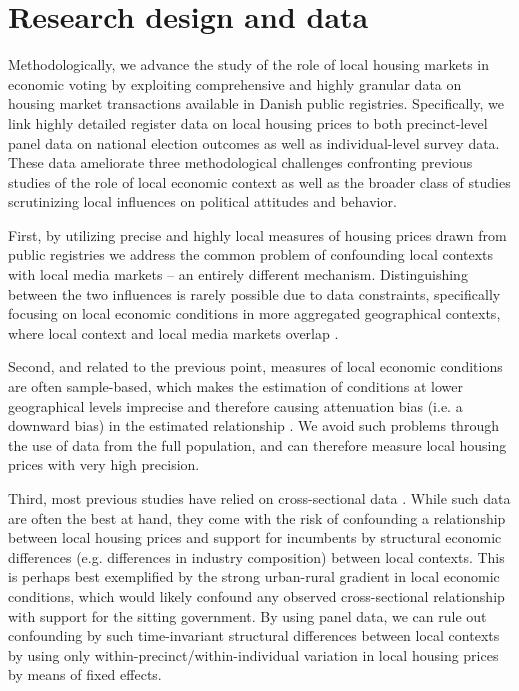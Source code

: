 \documentclass[12pt,a4paper]{article}
\begin{document}
	\section{Research design and data}\label{resdesign}
	
	Methodologically, we advance the study of the role of local housing markets in economic voting by exploiting comprehensive and highly granular data on housing market transactions available in Danish public registries. Specifically, we link highly detailed register data on local housing prices to both precinct-level panel data on national election outcomes as well as individual-level survey data. These data ameliorate three methodological challenges confronting previous studies of the role of local economic context as well as the broader class of studies scrutinizing local influences on political attitudes and behavior.
	
	First,  by utilizing precise and highly local measures of housing prices drawn from public registries we address the common problem of confounding local contexts with local media markets – an entirely different mechanism. Distinguishing between the two influences is rarely possible due to data constraints, specifically focusing on local economic conditions in more aggregated geographical contexts, where local context and local media markets overlap \citep[][]{bisgaard2016reconsidering}.  
	
	Second, and related to the previous point, measures of local economic conditions are often sample-based, which makes the estimation of conditions at lower geographical levels imprecise and therefore causing attenuation bias (i.e. a downward bias) in the estimated relationship \citep[][]{healy2017presidential}. We avoid such problems through the use of data from the full population, and can therefore measure local housing prices with very high precision.
	
	Third, most previous studies have relied on cross-sectional data \citep[][]{bisgaard2016reconsidering, reeves2012ecologies, ansolabehere2014mecro, books1999contextual}. While such data are often the best at hand, they come with the risk of confounding a relationship between local housing prices and support for incumbents by structural economic differences (e.g. differences in industry composition) between local contexts. This is perhaps best exemplified by the strong urban-rural gradient in local economic conditions, which would likely confound any observed cross-sectional relationship with support for the sitting government. By using panel data, we can rule out confounding by such time-invariant structural differences between local contexts by using only within-precinct/within-individual variation in local housing prices by means of fixed effects.
	
\end{document}
